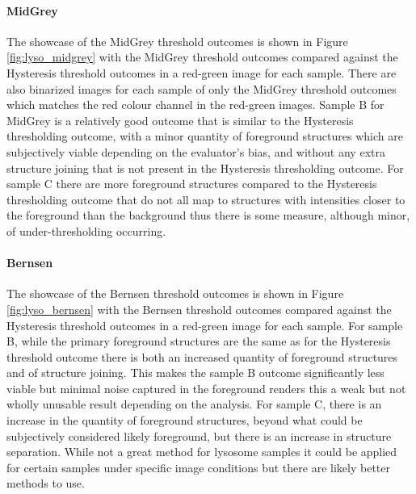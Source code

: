 \paragraph{MidGrey} The showcase of the MidGrey threshold outcomes is shown in Figure \ref{fig:lyso_midgrey} with the MidGrey threshold outcomes compared against the Hysteresis threshold outcomes in a red-green image for each sample. There are also binarized images for each sample of only the MidGrey threshold outcomes which matches the red colour channel in the red-green images. Sample B for MidGrey is a relatively good outcome that is similar to the Hysteresis thresholding outcome, with a minor quantity of foreground structures which are subjectively viable depending on the evaluator's bias, and without any extra structure joining that is not present in the Hysteresis thresholding outcome. For sample C there are more foreground structures compared to the Hysteresis thresholding outcome that do not all map to structures with intensities closer to the foreground than the background thus there is some measure, although minor, of under-thresholding occurring.

\FloatBarrier

\paragraph{Bernsen} The showcase of the Bernsen threshold outcomes is shown in Figure \ref{fig:lyso_bernsen} with the Bernsen threshold outcomes compared against the Hysteresis threshold outcomes in a red-green image for each sample. For sample B, while the primary foreground structures are the same as for the Hysteresis threshold outcome there is both an increased quantity of foreground structures and of structure joining. This makes the sample B outcome significantly less viable but minimal noise captured in the foreground renders this a weak but not wholly unusable result depending on the analysis. For sample C, there is an increase in the quantity of foreground structures, beyond what could be subjectively considered likely foreground, but there is an increase in structure separation. While not a great method for lysosome samples it could be applied for certain samples under specific image conditions but there are likely better methods to use.

